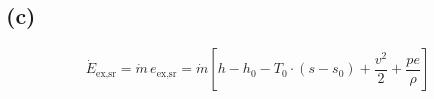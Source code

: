 

\subsection*{(c)}
\[
\dot{E}_{\text{ex,sr}} = \dot{m} \, e_{\text{ex,sr}} = \dot{m} \left[ h - h_0 - T_0 \cdot (s - s_0) + \frac{v^2}{2} + \frac{pe}{\rho} \right]
\]